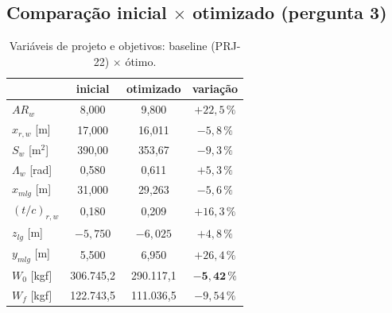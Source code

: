 \documentclass[11pt,a4paper]{article}
\begin{document}
\subsection{Comparação inicial \(\times\) otimizado (pergunta 3)}

\begin{table}[H]
\centering
\caption{Variáveis de projeto e objetivos: baseline (PRJ-22) $\times$ ótimo.}
\begin{tabular}{lccc}
\toprule
 & inicial & otimizado & variação \\
\midrule
$AR_w$            & 8{,}000  & 9{,}800  & $+22{,}5\,\%$ \\
$x_{r,w}$ [m]     & 17{,}000 & 16{,}011 & $-5{,}8\,\%$  \\
$S_w$ [m$^2$]     & 390{,}00 & 353{,}67 & $-9{,}3\,\%$  \\
$\Lambda_w$ [rad] & 0{,}580  & 0{,}611  & $+5{,}3\,\%$  \\
$x_{mlg}$ [m]     & 31{,}000 & 29{,}263 & $-5{,}6\,\%$  \\
$(t/c)_{r,w}$     & 0{,}180  & 0{,}209  & $+16{,}3\,\%$ \\
$z_{lg}$ [m]      & $-5{,}750$ & $-6{,}025$ & $+4{,}8\,\%$ \\
$y_{mlg}$ [m]     & 5{,}500  & 6{,}950  & $+26{,}4\,\%$ \\
\midrule
$W_0$ [kgf] & 306.745{,}2 & 290.117{,}1 & $\mathbf{-5{,}42\,\%}$ \\
$W_f$ [kgf] & 122.743{,}5 & 111.036{,}5 & $-9{,}54\,\%$ \\
\bottomrule
\end{tabular}
\end{table}
\end{document}
